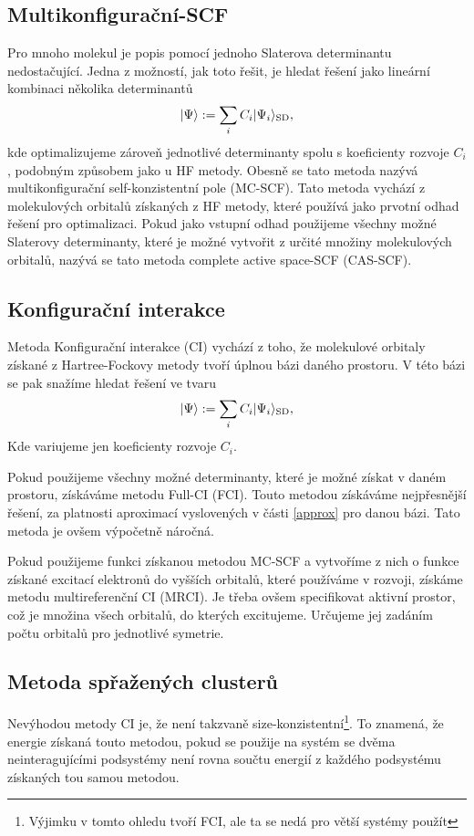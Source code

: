 \subsection{Multikonfigurační-SCF}
Pro mnoho molekul je popis pomocí jednoho Slaterova determinantu nedostačující.
Jedna z možností, jak toto řešit, je hledat řešení jako lineární kombinaci několika determinantů
\begin{equation}
| \Psi \rangle := \sum_i C_i | \Psi_i \rangle_{\mathrm{SD}},
\end{equation}
kde optimalizujeme zároveň jednotlivé determinanty spolu s koeficienty rozvoje $C_i$, 
podobným způsobem jako u HF metody.
Obesně se tato metoda nazývá multikonfigurační self-konzistentní pole (MC-SCF).
Tato metoda vychází z molekulových orbitalů získaných z HF metody, které používá jako 
prvotní odhad řešení pro optimalizaci.
Pokud jako vstupní odhad použijeme všechny možné Slaterovy determinanty, které je možné  
vytvořit z určité množiny molekulových orbitalů, nazývá se tato metoda complete active space-SCF (CAS-SCF). 

\subsection{Konfigurační interakce}
Metoda Konfigurační interakce (CI) vychází z toho, že molekulové orbitaly získané z Hartree-Fockovy metody tvoří úplnou bázi daného prostoru. V této bázi se pak snažíme hledat řešení ve tvaru
\begin{equation}
| \Psi \rangle := \sum_i C_i | \Psi_i \rangle_{\mathrm{SD}},
\end{equation}
Kde variujeme jen koeficienty rozvoje $C_i$.

Pokud použijeme všechny možné determinanty, které je možné získat v daném prostoru, 
získáváme metodu Full-CI (FCI). Touto metodou získáváme nejpřesnější řešení, za 
platnosti aproximací vyslovených v části \ref{approx} pro danou bázi. Tato metoda je 
ovšem výpočetně náročná.

Pokud použijeme funkci získanou metodou MC-SCF a vytvoříme z nich o funkce získané 
excitací elektronů do vyšších orbitalů, které používáme v rozvoji, získáme metodu
multireferenční CI (MRCI). Je třeba ovšem specifikovat aktivní prostor, což je množina
všech orbitalů, do kterých excitujeme. Určujeme jej zadáním počtu orbitalů pro 
jednotlivé symetrie. 

\subsection{Metoda spřažených clusterů}
Nevýhodou metody CI je, že není takzvaně size-konzistentní\footnote{Výjimku v tomto 
ohledu tvoří FCI, ale ta se nedá pro větší systémy použít}. To znamená, že energie 
získaná touto metodou, pokud se použije na systém se dvěma neinteragujícími podsystémy 
není rovna součtu energií z každého podsystému získaných tou samou metodou. 

